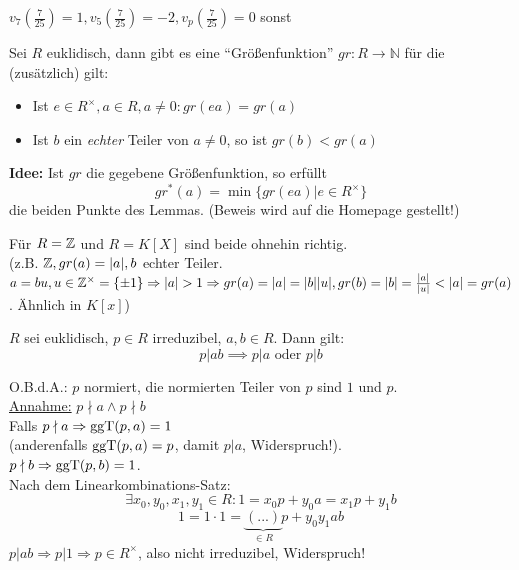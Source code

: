 \documentclass[a4paper,DIV15,BCOR12mm]{article}
\begin{document}
\begin{beispiel}
$v_7(\frac{7}{25}) = 1, v_5(\frac{7}{25}) = -2, v_p(\frac{7}{25}) =
0$ sonst
\end{beispiel}

\begin{lemma}
\label{lemma1} Sei $R$ euklidisch, dann gibt es eine
"`Größenfunktion"' $gr: R \to \mathbb{N}$ für die (zusätzlich) gilt:
\begin{itemize}
\item Ist $e \in R^\times, a \in R, a\not= 0: gr(ea) = gr(a)$
\item Ist $b$ ein \emph{echter} Teiler von $a \not= 0$, so ist $gr(b) < gr(a)$
\end{itemize}
\end{lemma}

\begin{beweis}
\textbf{Idee:} Ist $gr$ die gegebene Größenfunktion, so erfüllt
$$gr^*(a) = \min\{gr(ea) | e \in R^\times\}$$
die beiden Punkte des Lemmas. (Beweis wird auf die Homepage
gestellt!)
\end{beweis}

Für $R = \mathbb{Z}$ und $R = K[X]$ sind beide ohnehin richtig.\\
(z.B. $\mathbb{Z}, gr(a) = |a|, b$ echter Teiler. $a = bu, u \in
\mathbb{Z}^\times = \{\pm 1 \} \Rightarrow |a| > 1 \Rightarrow gr(a) = |a| =
|b||u|, gr(b) = |b| = \frac{|a|}{|u|} < |a| = gr(a)$. Ähnlich in
$K[x]$)

\begin{lemma}
\label{lemma2} $R$ sei euklidisch, $p \in R$ irreduzibel, $a,b \in
R$. Dann gilt:
\[p | ab \implies p | a \text{ oder } p|b\]
\end{lemma}

\begin{beweis}
O.B.d.A.: $p$ normiert, die normierten Teiler von $p$ sind $1$ und $p$.\\
\underline{Annahme:} $p \nmid a \wedge p \nmid b$\\
Falls $p \nmid a \Rightarrow \mathop{\rm ggT}\nolimits(p,a) = 1$ \\
(anderenfalls $\mathop{\rm ggT}\nolimits(p,a) = p$, damit $p | a$, Widerspruch!). \\
$p \nmid b \Rightarrow \mathop{\rm ggT}\nolimits(p,b) = 1$. \\
Nach dem Linearkombinations-Satz: \\
$$\exists x_0, y_0, x_1, y_1 \in R: 1 = x_0p + y_0a = x_1p + y_1b$$
$$1 = 1 \cdot 1 = \underbrace{(...)}_{\in R}p + y_0y_1ab$$
$p | ab \Rightarrow p | 1 \Rightarrow p \in R^\times$, also nicht
irreduzibel, Widerspruch!
\end{beweis}
\end{document}
